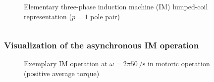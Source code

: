 \begin{frame}
\begin{columns}
\begin{column}{0.45\textwidth}
\begin{figure}
                \caption{Elementary three-phase induction machine (IM) lumped-coil representation ($p=1$ pole pair)}
                \label{fig:Simple_three_phase_induction_machine_lumped_coils}
            \end{figure}
        \end{column}
    \end{columns}
\end{frame}

\begin{frame}
	\frametitle{Visualization of the asynchronous IM operation}
    \vspace{-0.275cm}
    \begin{figure}
        \centering
        \vspace{-0.25cm}
        \caption{Exemplary IM operation at $\omega=2 \pi \SI{50}{\per\second}$ in motoric operation (positive average torque)}
        \label{fig:Clarke_Park_animation}
    \end{figure}
\end{frame}

